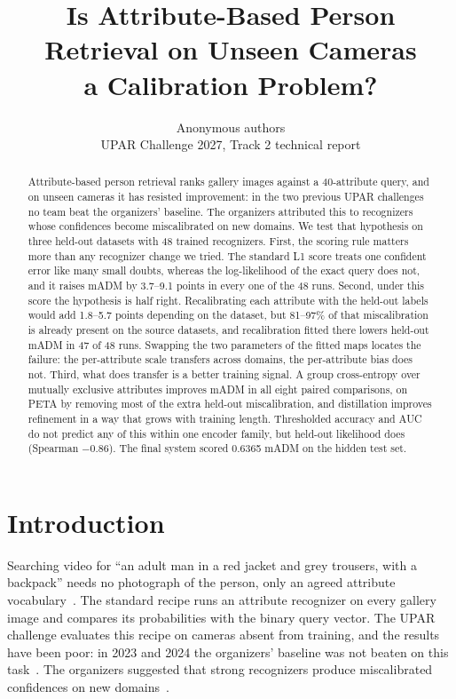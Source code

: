 \documentclass[10pt,twocolumn,letterpaper]{article}
\title{\Large\bf Is Attribute-Based Person Retrieval on Unseen Cameras\\ a Calibration Problem?}
\author{Anonymous authors\\ UPAR Challenge 2027, Track 2 technical report}
\date{}
\begin{document}
\maketitle

\begin{abstract}
Attribute-based person retrieval ranks gallery images against a 40-attribute query, and on unseen cameras it has resisted improvement: in the two previous UPAR challenges no team beat the organizers' baseline. The organizers attributed this to recognizers whose confidences become miscalibrated on new domains. We test that hypothesis on three held-out datasets with 48 trained recognizers. First, the scoring rule matters more than any recognizer change we tried. The standard L1 score treats one confident error like many small doubts, whereas the log-likelihood of the exact query does not, and it raises mADM by 3.7--9.1 points in every one of the 48 runs. Second, under this score the hypothesis is half right. Recalibrating each attribute with the held-out labels would add 1.8--5.7 points depending on the dataset, but 81--97\% of that miscalibration is already present on the source datasets, and recalibration fitted there lowers held-out mADM in 47 of 48 runs. Swapping the two parameters of the fitted maps locates the failure: the per-attribute scale transfers across domains, the per-attribute bias does not. Third, what does transfer is a better training signal. A group cross-entropy over mutually exclusive attributes improves mADM in all eight paired comparisons, on PETA by removing most of the extra held-out miscalibration, and distillation improves refinement in a way that grows with training length. Thresholded accuracy and AUC do not predict any of this within one encoder family, but held-out likelihood does (Spearman $-0.86$). The final system scored 0.6365 mADM on the hidden test set.
\end{abstract}

\section{Introduction}

Searching video for ``an adult man in a red jacket and grey trousers, with a backpack'' needs no photograph of the person, only an agreed attribute vocabulary~\cite{upar}. The standard recipe runs an attribute recognizer on every gallery image and compares its probabilities with the binary query vector. The UPAR challenge evaluates this recipe on cameras absent from training, and the results have been poor: in 2023 and 2024 the organizers' baseline was not beaten on this task~\cite{upar23,upar24}. The organizers suggested that strong recognizers produce miscalibrated confidences on new domains~\cite{upar24}.
\end{document}
